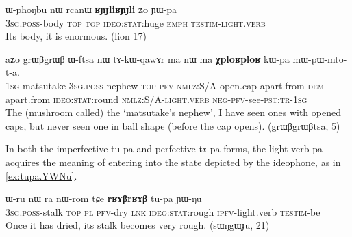 \documentclass[oldfontcommands,oneside,a4paper,11pt]{article}
\newcommand{\ipa}[1]{{\phon \mbox{#1}}} %
\begin{document}
\begin{exe}
\ex \label{ex:RYJli.Zo.YWpa}
\gll 
\ipa{ɯ-phoŋbu}  	\ipa{nɯ}  	\ipa{rcanɯ}  	\ipa{\textbf{ʁɲɟliʁɲɟli}}  	\ipa{ʑo}  	\ipa{ɲɯ-pa}   \\
\textsc{3sg.poss}-body \textsc{top} \textsc{top} \textsc{ideo:stat}:huge \textsc{emph} \textsc{testim}-\textsc{light.verb} \\
\glt  Its body, it is enormous. (lion 17)
\end{exe}
\begin{exe}
\ex \label{ex:XploR.kWpa}
\gll
\ipa{aʑo}  	\ipa{grɯβgrɯβ}  	\ipa{ɯ-ftsa}  	\ipa{nɯ}  	\ipa{tɤ-kɯ-qawɤr}  	\ipa{ma}  	\ipa{nɯ}  	\ipa{ma}  	\ipa{\textbf{χploʁploʁ}}  	\ipa{kɯ-pa}  	\ipa{mɯ-pɯ-mto-t-a.}  	\\
\textsc{1sg} matsutake \textsc{3sg.poss}-nephew \textsc{top} \textsc{pfv-nmlz}:S/A-open.cap apart.from \textsc{dem} apart.from \textsc{ideo:stat}:round \textsc{nmlz:S/A}-\textsc{light.verb} \textsc{neg-pfv}-see-\textsc{pst:tr-1sg} \\
\glt The (mushroom called) the `matsutake's nephew', I have seen ones with opened caps, but never seen one in ball shape (before the cap opens). (grɯβgrɯβtsa, 5)
\end{exe}

In both the imperfective \ipa{tu-pa} and perfective \ipa{tɤ-pa} forms, the light verb \ipa{pa} acquires the meaning of entering into the state depicted by the ideophone, as in \ref{ex:tupa.YWNu}.
\begin{exe}
\ex \label{ex:tupa.YWNu}
\gll
\ipa{ɯ-ru}  	\ipa{nɯ} \ipa{ra}  	\ipa{nɯ-rom}  	\ipa{tɕe}  	\ipa{\textbf{rʁɤβrʁɤβ}}  	\ipa{tu-pa}  	\ipa{ɲɯ-ŋu}  \\
\textsc{3sg.poss}-stalk \textsc{top} \textsc{pl} \textsc{pfv}-dry \textsc{lnk} \textsc{ideo:stat}:rough \textsc{ipfv}-light.verb \textsc{testim}-be \\
\glt Once it has dried, its stalk becomes very rough. (sɯŋgɯɟu, 21)
\end{exe}
\end{document}
